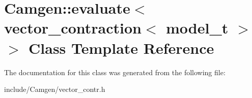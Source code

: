\hypertarget{a00202}{}\section{Camgen\+:\+:evaluate$<$ vector\+\_\+contraction$<$ model\+\_\+t $>$ $>$ Class Template Reference}
\label{a00202}


The documentation for this class was generated from the following file\+:\begin{DoxyCompactItemize}
\item 
include/\+Camgen/vector\+\_\+contr.\+h\end{DoxyCompactItemize}
